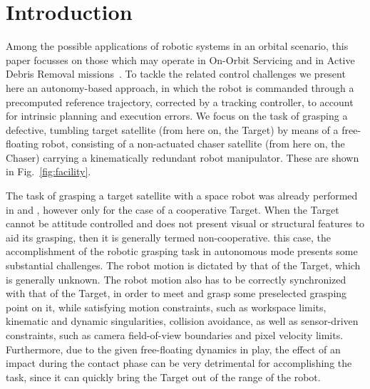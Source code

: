 \section{Introduction}
%
Among the possible applications of robotic systems in an orbital scenario, this paper focusses on those which may operate in On-Orbit Servicing and in Active Debris Removal missions~\cite{932685}\cite{Shoemaker2003}\cite{dlr63555}\cite{telaar2017gnc}. To tackle the related control challenges we present here an autonomy-based approach, in which the robot is commanded through a precomputed reference trajectory, corrected by a tracking controller, to account for intrinsic planning and execution errors. We focus on the task of grasping a defective, tumbling target satellite (from here on, the Target) by means of a free-floating robot, consisting of a non-actuated chaser satellite (from here on, the Chaser) carrying a kinematically redundant robot manipulator. These are shown in Fig.~\ref{fig:facility}.

The task of grasping a target satellite with a space robot was already performed in \cite{932685} and \cite{Shoemaker2003}, however only for the case of a cooperative Target. When the Target cannot be attitude controlled and does not present  visual or structural features to aid its grasping, then it is generally termed non-cooperative.  this case, the accomplishment of the robotic grasping task in autonomous mode presents some substantial challenges. The robot motion is dictated by that of the Target, which is generally unknown. The robot motion also has to be correctly synchronized with that of the Target, in order to meet and grasp some preselected grasping point on it, while satisfying motion constraints, such as workspace limits, kinematic and dynamic singularities, collision avoidance, as well as sensor-driven constraints, such as camera field-of-view boundaries and pixel velocity limits. Furthermore, due to the given free-floating dynamics in play, the effect of an impact during the contact phase can be very detrimental for accomplishing the task, since it can quickly bring the Target out of the range of the robot.

